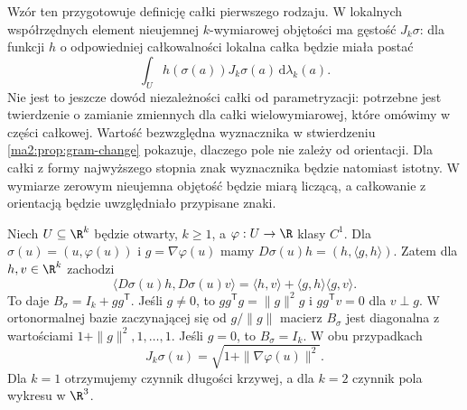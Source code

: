 Wzór ten przygotowuje definicję całki pierwszego rodzaju.
W lokalnych współrzędnych element nieujemnej
$k$-wymiarowej objętości ma gęstość $J_k\sigma$:
dla funkcji $h$ o odpowiedniej całkowalności
lokalna całka będzie miała postać
\[
 \int_U h(\sigma(a))J_k\sigma(a)\,
                       \mathrm d\lambda_k(a).
\]
Nie jest to jeszcze dowód niezależności całki od
parametryzacji: potrzebne jest twierdzenie o zamianie
zmiennych dla całki wielowymiarowej, które omówimy
w części całkowej. Wartość bezwzględna wyznacznika
w stwierdzeniu \ref{ma2:prop:gram-change} pokazuje,
dlaczego pole nie zależy od orientacji.
Dla całki z formy najwyższego stopnia znak wyznacznika
będzie natomiast istotny. W wymiarze zerowym
nieujemna objętość będzie miarą liczącą, a całkowanie
z orientacją będzie uwzględniało przypisane znaki.

\begin{przyklad}
\label{ma2:ex:graph-area-factor}
Niech $U\subseteq\R^k$ będzie otwarty, $k\ge1$,
a $\varphi:U\to\R$ klasy $C^1$.
Dla $\sigma(u)=(u,\varphi(u))$ i
$g=\nabla\varphi(u)$ mamy
$D\sigma(u)h=(h,\langle g,h\rangle)$. Zatem
dla $h,v\in\R^k$ zachodzi
\[
 \langle D\sigma(u)h,D\sigma(u)v\rangle
 =\langle h,v\rangle+\langle g,h\rangle\langle g,v\rangle.
\]
To daje $B_\sigma=I_k+gg^{\mathsf T}$. Jeśli $g\ne0$, to
$gg^{\mathsf T}g=\|g\|^2g$ i
$gg^{\mathsf T}v=0$ dla $v\perp g$.
W ortonormalnej bazie zaczynającej się od
$g/\|g\|$ macierz $B_\sigma$ jest diagonalna
z wartościami $1+\|g\|^2,1,\ldots,1$.
Jeśli $g=0$, to $B_\sigma=I_k$.
W obu przypadkach
\[
 J_k\sigma(u)=\sqrt{1+\|\nabla\varphi(u)\|^2}.
\]
Dla $k=1$ otrzymujemy czynnik długości krzywej,
a dla $k=2$ czynnik pola wykresu w $\R^3$.
\end{przyklad}

